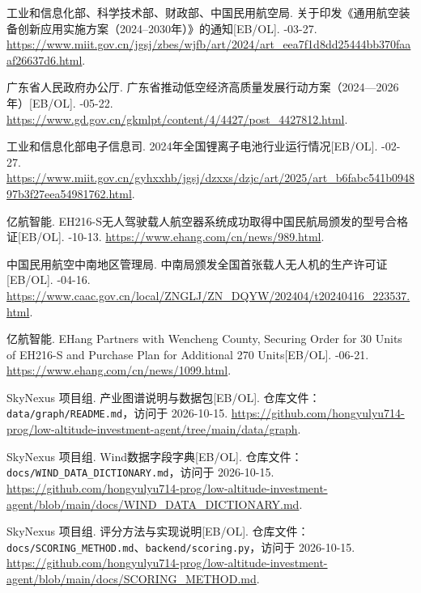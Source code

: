 工业和信息化部、科学技术部、财政部、中国民用航空局.
\newblock 关于印发《通用航空装备创新应用实施方案（2024--2030年）》的通知[EB/OL].
-03-27. \url{https://www.miit.gov.cn/jgsj/zbes/wjfb/art/2024/art_eea7f1d8dd25444bb370faaaf26637d6.html}.

广东省人民政府办公厅.
\newblock 广东省推动低空经济高质量发展行动方案（2024—2026年）[EB/OL].
-05-22. \url{https://www.gd.gov.cn/gkmlpt/content/4/4427/post_4427812.html}.

工业和信息化部电子信息司.
\newblock 2024年全国锂离子电池行业运行情况[EB/OL].
-02-27. \url{https://www.miit.gov.cn/gyhxxhb/jgsj/dzxxs/dzjc/art/2025/art_b6fabc541b094897b3f27eea54981762.html}.

亿航智能.
\newblock EH216-S无人驾驶载人航空器系统成功取得中国民航局颁发的型号合格证[EB/OL].
-10-13. \url{https://www.ehang.com/cn/news/989.html}.

中国民用航空中南地区管理局.
\newblock 中南局颁发全国首张载人无人机的生产许可证[EB/OL].
-04-16. \url{https://www.caac.gov.cn/local/ZNGLJ/ZN_DQYW/202404/t20240416_223537.html}.

亿航智能.
\newblock EHang Partners with Wencheng County, Securing Order for 30 Units of EH216-S and Purchase Plan for Additional 270 Units[EB/OL].
-06-21. \url{https://www.ehang.com/cn/news/1099.html}.

SkyNexus 项目组.
\newblock 产业图谱说明与数据包[EB/OL].
\newblock 仓库文件：\texttt{data/graph/README.md}，访问于 2026-10-15.
\newblock \url{https://github.com/hongyulyu714-prog/low-altitude-investment-agent/tree/main/data/graph}.

SkyNexus 项目组.
\newblock Wind数据字段字典[EB/OL].
\newblock 仓库文件：\texttt{docs/WIND\_DATA\_DICTIONARY.md}，访问于 2026-10-15.
\newblock \url{https://github.com/hongyulyu714-prog/low-altitude-investment-agent/blob/main/docs/WIND_DATA_DICTIONARY.md}.

SkyNexus 项目组.
\newblock 评分方法与实现说明[EB/OL].
\newblock 仓库文件：\texttt{docs/SCORING\_METHOD.md}、\texttt{backend/scoring.py}，访问于 2026-10-15.
\newblock \url{https://github.com/hongyulyu714-prog/low-altitude-investment-agent/blob/main/docs/SCORING_METHOD.md}.
